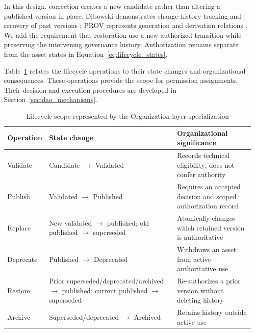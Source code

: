 \documentclass[journal]{IEEEtran}
\begin{document}
In this design, correction creates a new candidate rather than
altering a published version in place. Dibowski demonstrates
change-history tracking and recovery of past versions
\cite{Dibowski2024TraceabilityKG}; PROV represents generation
and derivation relations \cite{Moreau2013PROV,Lebo2013PROVO}.
We add the requirement that restoration use a new authorized
transition while preserving the intervening governance history.
Authorization remains separate from the asset states in
Equation~\ref{eq:lifecycle_states}.

Table~\ref{tab:lifecycle_requirements} relates the lifecycle
operations to their state changes and organizational
consequences. These operations provide the scope for
permission assignments. Their decision and execution
procedures are developed in Section~\ref{sec:dao_mechanisms}.

\begin{table}[t]
\caption{Lifecycle scope represented by the Organization-layer
specialization}
\label{tab:lifecycle_requirements}
\centering
\begin{tabular}{p{1.9cm}p{2.3cm}p{3.1cm}}
\hline
Operation & State change & Organizational significance\\
\hline
Validate &
Candidate $\rightarrow$ Validated &
Records technical eligibility; does not confer authority\\

Publish &
Validated $\rightarrow$ Published &
Requires an accepted decision and scoped authorization record\\

Replace &
New validated $\rightarrow$ published;
old published $\rightarrow$ superseded &
Atomically changes which retained version is authoritative\\

Deprecate &
Published $\rightarrow$ Deprecated &
Withdraws an asset from active authoritative use\\

Restore &
Prior superseded/deprecated/archived $\rightarrow$ published;
current published $\rightarrow$ superseded &
Re-authorizes a prior version without deleting history\\

Archive &
Superseded/\allowbreak deprecated $\rightarrow$ Archived &
Retains history outside active use\\
\hline
\end{tabular}
\end{table}
\end{document}
